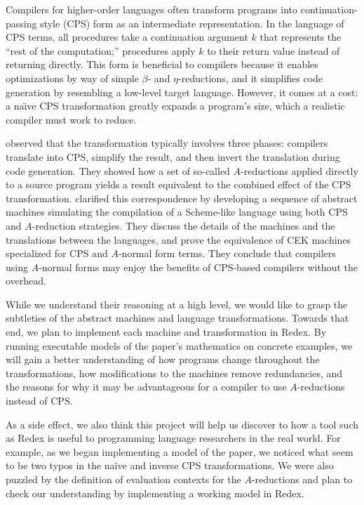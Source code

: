 \documentclass[11pt]{article}
\begin{document}
\thispagestyle{fancy}

Compilers for higher-order languages often transform programs into
continuation-passing style (CPS) form as an intermediate representation. In the
language of CPS terms, all procedures take a continuation argument $k$
that represents the ``rest of the computation;'' procedures apply $k$ to their
return value instead of returning directly. This form is beneficial to
compilers because it enables optimizations by way of simple $\beta$- and
$\eta$-reductions, and it simplifies code generation by resembling a low-level
target language.
However, it comes at a cost: a na\"{\i}ve CPS transformation greatly expands a
program's size, which a realistic compiler must work to reduce.

\citet{Sabry:1992zr} observed that the transformation typically involves three
phases: compilers translate into CPS, simplify the result, and then invert the
translation during code generation. They showed how a set of so-called
$A$-reductions applied directly to a source program yields a result equivalent
to the combined effect of the CPS transformation.
\citet{Flanagan:1993fk} clarified this correspondence by developing a sequence
of abstract machines simulating the compilation of a Scheme-like language using
both CPS and $A$-reduction strategies.  They discuss the details of the
machines and the translations between the languages, and prove the equivalence
of CEK machines specialized for CPS and $A$-normal form terms.  They conclude
that compilers using $A$-normal forms may enjoy the benefits of CPS-based
compilers without the overhead.


While we understand their reasoning at a high level, we would like to grasp
the subtleties of the abstract machines and language transformations.
Towards that end, we plan to implement each machine and transformation
in Redex. By running executable models of the paper's mathematics on concrete
examples, we will gain a better understanding of how programs change throughout
the transformations, how modifications to the machines remove redundancies, and
the reasons for why it may be advantageous for a compiler to use $A$-reductions
instead of CPS.

As a side effect, we also think this project will help us discover to how a
tool such as Redex is useful to programming language researchers in the
real world. For example, as we began implementing a model of the paper,
we noticed what seem to be two typos in the na\"{i}ve and inverse CPS
transformations. We were also puzzled by the definition of evaluation contexts
for the $A$-reductions and plan to check our understanding by implementing a
working model in Redex.



\end{document}
